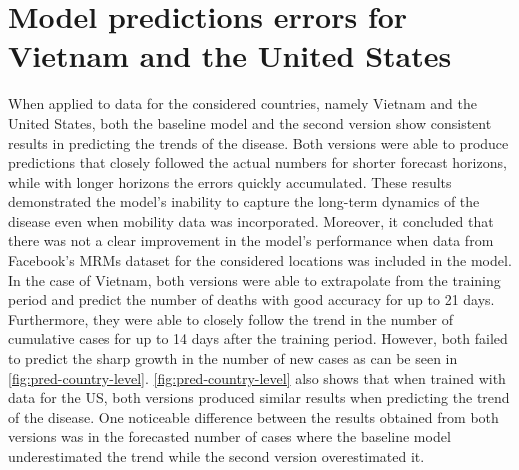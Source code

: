 \section{Model predictions errors for Vietnam and the United States}

When applied to data for the considered countries, namely Vietnam and the United States, both the baseline model and the second version show consistent results in predicting the trends of the disease.
Both versions were able to produce predictions that closely followed the actual numbers for shorter forecast horizons, while with longer horizons the errors quickly accumulated.
These results demonstrated the model's inability to capture the long-term dynamics of the disease even when mobility data was incorporated.
Moreover, it concluded that there was not a clear improvement in the model's performance when data from Facebook's \glspl{MRM} dataset for the considered locations was included in the model.
In the case of Vietnam, both versions were able to extrapolate from the training period and predict the number of deaths with good accuracy for up to 21 days.
Furthermore, they were able to closely follow the trend in the number of cumulative cases for up to 14 days after the training period.
However, both failed to predict the sharp growth in the number of new cases as can be seen in \autoref{fig:pred-country-level}.
\autoref{fig:pred-country-level} also shows that when trained with data for the \gls{US}, both versions produced similar results when predicting the trend of the disease.
One noticeable difference between the results obtained from both versions was in the forecasted number of cases where the baseline model underestimated the trend while the second version overestimated it.


